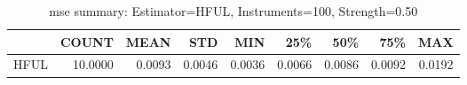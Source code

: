 \begin{table}[ht]
\centering
\caption{mse summary: Estimator=HFUL, Instruments=100, Strength=0.50}
\begin{tabular}{lrrrrrrrr}
\toprule
 & COUNT & MEAN & STD & MIN & 25\% & 50\% & 75\% & MAX \\
\midrule
HFUL & 10.0000 & 0.0093 & 0.0046 & 0.0036 & 0.0066 & 0.0086 & 0.0092 & 0.0192 \\
\bottomrule
\end{tabular}
\end{table}
